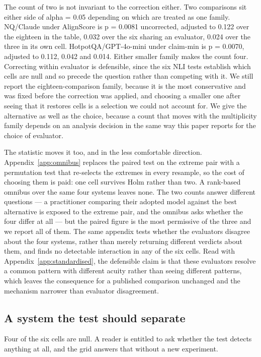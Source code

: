 \documentclass[11pt]{article}
\begin{document}
The count of two is not invariant to the correction either. Two comparisons sit either side of alpha = 0.05 depending on which are treated as one family. NQ/Claude under AlignScore is p = 0.0081 uncorrected, adjusted to 0.122 over the eighteen in the table, 0.032 over the six sharing an evaluator, 0.024 over the three in its own cell. HotpotQA/GPT-4o-mini under claim-min is p = 0.0070, adjusted to 0.112, 0.042 and 0.014. Either smaller family makes the count four. Correcting within evaluator is defensible, since the six NLI tests establish which cells are null and so precede the question rather than competing with it. We still report the eighteen-comparison family, because it is the most conservative and was fixed before the correction was applied, and choosing a smaller one after seeing that it restores cells is a selection we could not account for. We give the alternative as well as the choice, because a count that moves with the multiplicity family depends on an analysis decision in the same way this paper reports for the choice of evaluator.

The statistic moves it too, and in the less comfortable direction. Appendix~\ref{app:omnibus} replaces the paired test on the extreme pair with a permutation test that re-selects the extremes in every resample, so the cost of choosing them is paid: one cell survives Holm rather than two. A rank-based omnibus over the same four systems leaves none. The two counts answer different questions --- a practitioner comparing their adopted model against the best alternative is exposed to the extreme pair, and the omnibus asks whether the four differ at all --- but the paired figure is the most permissive of the three and we report all of them. The same appendix tests whether the evaluators disagree about the four systems, rather than merely returning different verdicts about them, and finds no detectable interaction in any of the six cells. Read with Appendix~\ref{app:standardised}, the defensible claim is that these evaluators resolve a common pattern with different acuity rather than seeing different patterns, which leaves the consequence for a published comparison unchanged and the mechanism narrower than evaluator disagreement.


\subsection{A system the test should separate}
\label{sec:control}

Four of the six cells are null. A reader is entitled to ask whether the test detects anything at all, and the grid answers that without a new experiment.
\end{document}
